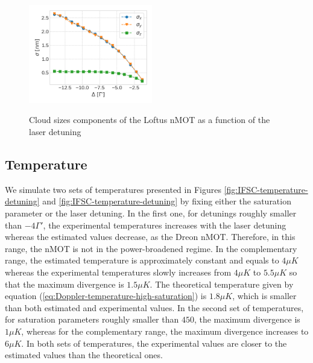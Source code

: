\begin{figure}[!ht]
    \centering
    \caption{Cloud sizes components of the Loftus nMOT as a function of the laser detuning}
    \includegraphics[width=0.48\textwidth]{USPSC-img/sr_loftus_cloud_size.png}
    \vspace{5px}
    \label{fig:sr-loftus-cloud-size}
\end{figure}


\subsection{Temperature}
\label{temperature}

We simulate two sets of temperatures presented in Figures \ref{fig:IFSC-temperature-detuning} and \ref{fig:IFSC-temperature-detuning} by fixing either the saturation parameter or the laser detuning. In the first one, for detunings roughly smaller than $ -4 \Gamma' $, the experimental temperatures increases with the laser detuning whereas the estimated values decrease, as the Dreon nMOT. Therefore, in this range, the nMOT is not in the power-broadened regime. In the complementary range, the estimated temperature is approximately constant and equals to $ 4 \mu K $ whereas the experimental temperatures slowly increases from $ 4\mu K $ to $ 5.5\mu K $ so that the maximum divergence is $ 1.5\mu K $. The theoretical temperature given by equation (\ref{eq:Doppler-temperature-high-saturation}) is $ 1.8 \mu K $, which is smaller than both estimated and experimental values. In the second set of temperatures, for saturation parameters roughly smaller than $ 450 $, the maximum divergence is $ 1 \mu K $, whereas for the complementary range, the maximum divergence increases to $ 6\mu K $. In both sets of temperatures, the experimental values are closer to the estimated values than the theoretical ones.

